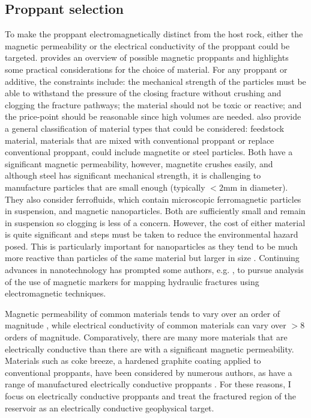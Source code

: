\subsection{Proppant selection}
To make the proppant electromagnetically distinct from the host rock, either the magnetic permeability or the electrical conductivity of the proppant could be targeted. \cite{Zawadzki2016} provides an overview of possible magnetic proppants and highlights some practical considerations for the choice of material. For any proppant or additive, the constraints include: the mechanical strength of the particles must be able to withstand the pressure of the closing fracture without crushing and clogging the fracture pathways; the material should not be toxic or reactive; and the price-point should be reasonable since high volumes are needed. \cite{Zawadzki2016} also provide a general classification of material types that could be considered: feedstock material, materials that are mixed with conventional proppant or replace conventional proppant, could include magnetite or steel particles. Both have a significant magnetic permeability, however, magnetite crushes easily, and although steel has significant mechanical strength, it is challenging to manufacture particles that are small enough (typically $< 2$mm in diameter). They also consider ferrofluids, which contain microscopic ferromagnetic particles in suspension, and magnetic nanoparticles. Both are sufficiently small and remain in suspension so clogging is less of a concern. However, the cost of either material is quite significant and steps must be taken to reduce the environmental hazard posed. This is particularly important for nanoparticles as they tend to be much more reactive than particles of the same material but larger in size \citep{Zawadzki2016}. Continuing advances in nanotechnology has prompted some authors, e.g. \citep{Rahmani2014}, to pursue analysis of the use of magnetic markers for mapping hydraulic fractures using electromagnetic techniques.

Magnetic permeability of common materials tends to vary over an order of magnitude \citep{Telford1990}, while electrical conductivity of common materials can vary over $> 8$ orders of magnitude. Comparatively, there are many more materials that are electrically conductive than there are with a significant magnetic permeability. Materials such as coke breeze, a hardened graphite coating applied to conventional proppants, have been considered by numerous authors, as have a range of manufactured electrically conductive proppants \citep{Pardo2013, Hoversten2015, Weiss2015, Labrecque2016, Hu2018}. For these reasons, I focus on electrically conductive proppants and treat the fractured region of the reservoir as an electrically conductive geophysical target.

